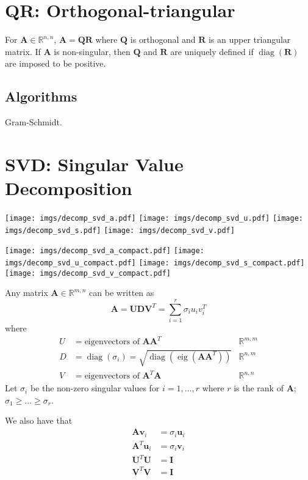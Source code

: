 \documentclass{book}
\newcommand{\mA}{\mathbf{A}}
\newcommand{\mD}{\mathbf{D}}
\newcommand{\mI}{\mathbf{I}}
\newcommand{\mQ}{\mathbf{Q}}
\newcommand{\mR}{\mathbf{R}}
\newcommand{\mU}{\mathbf{U}}
\newcommand{\mV}{\mathbf{V}}
\newcommand{\vu}{\mathbf{u}}
\newcommand{\vv}{\mathbf{v}}
\DeclareMathOperator{\diag}{diag}
\DeclareMathOperator{\eig}{eig}
\newcommand{\sRnm}{\mathbb{R}^{n,m}}
\newcommand{\sRmn}{\mathbb{R}^{m,n}}
\newcommand{\sRnn}{\mathbb{R}^{n,n}}
\newcommand{\sRmm}{\mathbb{R}^{m,m}}
\begin{document}
\section{QR: Orthogonal-triangular}

For $\mA\in\sRnn$, $\mA=\mQ\mR$ where $\mQ$ is orthogonal and $\mR$ is an upper triangular matrix. If $\mA$ is non-singular, then $\mQ$ and $\mR$ are uniquely defined if $\diag(\mR)$ are imposed to be positive.

\subsection*{Algorithms}

Gram-Schmidt.




\section{SVD: Singular Value Decomposition}

\begin{center}
\texttt{[image: imgs/decomp\_svd\_a.pdf]}
\texttt{[image: imgs/decomp\_svd\_u.pdf]}
\texttt{[image: imgs/decomp\_svd\_s.pdf]}
\texttt{[image: imgs/decomp\_svd\_v.pdf]}
\end{center}

\begin{center}
\texttt{[image: imgs/decomp\_svd\_a\_compact.pdf]}
\texttt{[image: imgs/decomp\_svd\_u\_compact.pdf]}
\texttt{[image: imgs/decomp\_svd\_s\_compact.pdf]}
\texttt{[image: imgs/decomp\_svd\_v\_compact.pdf]}
\end{center}

Any matrix $\mA\in\sRmn$ can be written as
\begin{equation}
\mA=\mU \mD \mV^T=\sum_{i=1}^r \sigma_i u_i v_i^T
\end{equation}
where
\begin{align}
U&=\textrm{eigenvectors of~}\mA\mA^T & \sRmm \\
D&=\diag(\sigma_i)=\sqrt{\diag(\eig(\mA\mA^T))}      & \sRnm \\
V&=\textrm{eigenvectors of~}\mA^T\mA & \sRnn
\end{align}
Let $\sigma_i$ be the non-zero singular values for $i=1,\ldots,r$ where $r$ is the rank of $\mA$; $\sigma_1\ge\ldots\ge\sigma_r$.

We also have that
\begin{align}
\mA   \vv_i &= \sigma_i \vu_i \\
\mA^T \vu_i &= \sigma_i \vv_i \\
\mU^T\mU &= \mI \\
\mV^T\mV &= \mI
\end{align}
\end{document}
